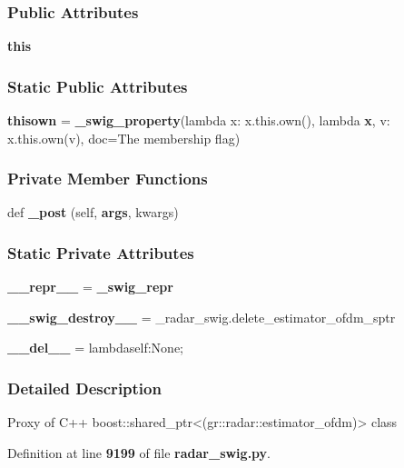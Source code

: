 \subsubsection*{Public Attributes}
\begin{DoxyCompactItemize}
\item 
{\bf this}
\end{DoxyCompactItemize}
\subsubsection*{Static Public Attributes}
\begin{DoxyCompactItemize}
\item 
{\bf thisown} = {\bf \+\_\+swig\+\_\+property}(lambda x\+: x.\+this.\+own(), lambda {\bf x}, v\+: x.\+this.\+own(v), doc=\textquotesingle{}The membership flag\textquotesingle{})
\end{DoxyCompactItemize}
\subsubsection*{Private Member Functions}
\begin{DoxyCompactItemize}
\item 
def {\bf \+\_\+post} (self, {\bf args}, kwargs)
\end{DoxyCompactItemize}
\subsubsection*{Static Private Attributes}
\begin{DoxyCompactItemize}
\item 
{\bf \+\_\+\+\_\+repr\+\_\+\+\_\+} = {\bf \+\_\+swig\+\_\+repr}
\item 
{\bf \+\_\+\+\_\+swig\+\_\+destroy\+\_\+\+\_\+} = \+\_\+radar\+\_\+swig.\+delete\+\_\+estimator\+\_\+ofdm\+\_\+sptr
\item 
{\bf \+\_\+\+\_\+del\+\_\+\+\_\+} = lambdaself\+:\+None;
\end{DoxyCompactItemize}


\subsubsection{Detailed Description}
\begin{DoxyVerb}Proxy of C++ boost::shared_ptr<(gr::radar::estimator_ofdm)> class\end{DoxyVerb}
 

Definition at line {\bf 9199} of file {\bf radar\+\_\+swig.\+py}.



